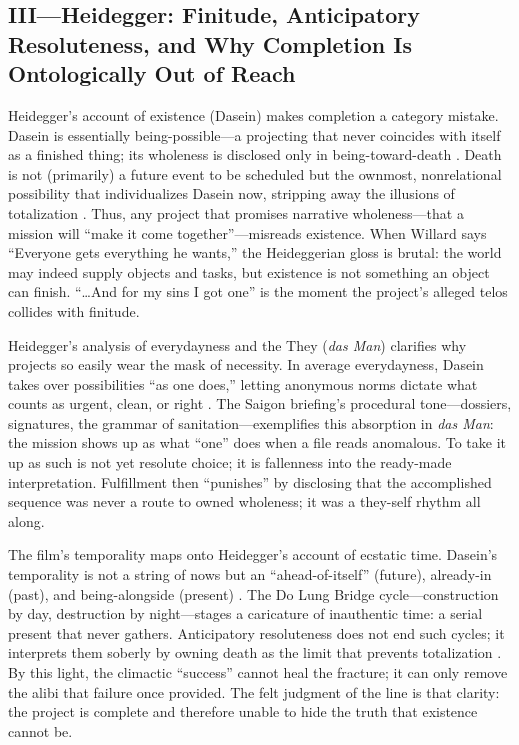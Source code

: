 \subsection*{III—Heidegger: Finitude, Anticipatory Resoluteness, and Why Completion Is
	Ontologically Out of Reach}
\label{ssec:iii-heidegger}
Heidegger's account of existence (Dasein) makes completion a category mistake. Dasein is
essentially being-possible—a projecting that never coincides with itself as a finished thing;
its wholeness is disclosed only in being-toward-death \parencite[pp.~279--311]{HeideggerBT1962}.
Death is not (primarily) a future event to be scheduled but the ownmost, nonrelational
possibility that individualizes Dasein now, stripping away the illusions of totalization
\parencite[pp.~294--307]{HeideggerBT1962}. Thus, any project that promises narrative wholeness—that
a mission will ``make it come together''—misreads existence. When Willard says ``Everyone gets
everything he wants,'' the Heideggerian gloss is brutal: the world may indeed supply objects and
tasks, but existence is not something an object can finish. ``\ldots And for my sins I got one''
is the moment the project's alleged telos collides with finitude.

Heidegger's analysis of everydayness and the They (\emph{das Man}) clarifies why projects so
easily wear the mask of necessity. In average everydayness, Dasein takes over possibilities ``as
one does,'' letting anonymous norms dictate what counts as urgent, clean, or right
\parencite[pp.~149--168]{HeideggerBT1962}. The Saigon briefing's procedural tone—dossiers,
signatures, the grammar of sanitation—exemplifies this absorption in \emph{das Man}: the mission
shows up as what ``one'' does when a file reads anomalous. To take it up as such is not yet
resolute choice; it is fallenness into the ready-made interpretation. Fulfillment then
``punishes'' by disclosing that the accomplished sequence was never a route to owned wholeness;
it was a they-self rhythm all along.

The film's temporality maps onto Heidegger's account of ecstatic time. Dasein's temporality is
not a string of nows but an ``ahead-of-itself'' (future), already-in (past), and being-alongside
(present) \parencite[pp.~373--383]{HeideggerBT1962}. The Do Lung Bridge cycle—construction by
day, destruction by night—stages a caricature of inauthentic time: a serial present that never
gathers. Anticipatory resoluteness does not end such cycles; it interprets them soberly by
owning death as the limit that prevents totalization \parencite[pp.~307--311]{HeideggerBT1962}.
By this light, the climactic ``success'' cannot heal the fracture; it can only remove the alibi
that failure once provided. The felt judgment of the line is that clarity: the project is
complete and therefore unable to hide the truth that existence cannot be.

